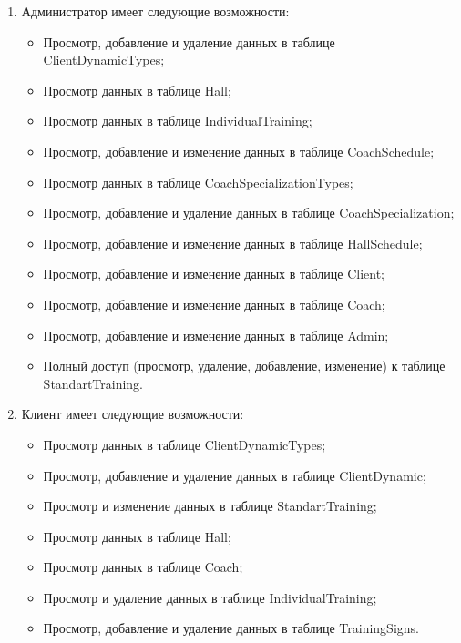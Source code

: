 \begin{enumerate}
    \item Администратор имеет следующие возможности:
    \begin{itemize}
        \item[---] Просмотр, добавление и удаление данных в таблице ClientDynamicTypes;
        \item[---] Просмотр данных в таблице Hall;
        \item[---] Просмотр данных в таблице IndividualTraining;
        \item[---] Просмотр, добавление и изменение данных в таблице CoachSchedule;
        \item[---] Просмотр данных в таблице CoachSpecializationTypes;
        \item[---] Просмотр, добавление и удаление данных в таблице CoachSpecialization;
        \item[---] Просмотр, добавление и изменение данных в таблице HallSchedule;
        \item[---] Просмотр, добавление и изменение данных в таблице Client;
        \item[---] Просмотр, добавление и изменение данных в таблице Coach;
        \item[---] Просмотр, добавление и изменение данных в таблице Admin;
        \item[---] Полный доступ (просмотр, удаление, добавление, изменение) к таблице StandartTraining.
    \end{itemize}

    \item Клиент имеет следующие возможности:
    \begin{itemize}
        \item[---] Просмотр данных в таблице ClientDynamicTypes;
        \item[---] Просмотр, добавление и удаление данных в таблице ClientDynamic;
        \item[---] Просмотр и изменение данных в таблице StandartTraining;
        \item[---] Просмотр данных в таблице Hall;
        \item[---] Просмотр данных в таблице Coach;
        \item[---] Просмотр и удаление данных в таблице IndividualTraining;
        \item[---] Просмотр, добавление и удаление данных в таблице TrainingSigns.
    \end{itemize}


\end{enumerate}
